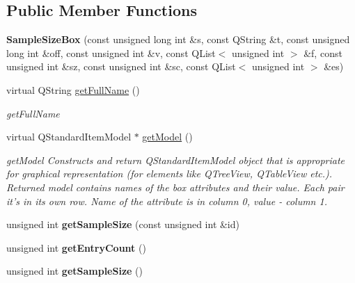 \subsection*{Public Member Functions}
\begin{DoxyCompactItemize}
\item 
\hypertarget{class_sample_size_box_a77e5453bb71d0c6072af6828970182e9}{{\bfseries Sample\-Size\-Box} (const unsigned long int \&s, const Q\-String \&t, const unsigned long int \&off, const unsigned int \&v, const Q\-List$<$ unsigned int $>$ \&f, const unsigned int \&sz, const unsigned int \&sc, const Q\-List$<$ unsigned int $>$ \&es)}\label{class_sample_size_box_a77e5453bb71d0c6072af6828970182e9}

\item 
virtual Q\-String \hyperlink{class_sample_size_box_a3cdb87618bba15d0c9e8cea9dde19ee5}{get\-Full\-Name} ()
\begin{DoxyCompactList}\small\item\em get\-Full\-Name \end{DoxyCompactList}\item 
virtual Q\-Standard\-Item\-Model $\ast$ \hyperlink{class_sample_size_box_a4ca94df68b61aebbe2c3b46b18a8d5e5}{get\-Model} ()
\begin{DoxyCompactList}\small\item\em get\-Model Constructs and return Q\-Standard\-Item\-Model object that is appropriate for graphical representation (for elements like Q\-Tree\-View, Q\-Table\-View etc.). Returned model contains names of the box attributes and their value. Each pair it's in its own row. Name of the attribute is in column 0, value -\/ column 1. \end{DoxyCompactList}\item 
\hypertarget{class_sample_size_box_ac31a0ecc005d1de51905250dd8deec25}{unsigned int {\bfseries get\-Sample\-Size} (const unsigned int \&id)}\label{class_sample_size_box_ac31a0ecc005d1de51905250dd8deec25}

\item 
\hypertarget{class_sample_size_box_ae4138da08b7f635ca32ed4aa6bcc005e}{unsigned int {\bfseries get\-Entry\-Count} ()}\label{class_sample_size_box_ae4138da08b7f635ca32ed4aa6bcc005e}

\item 
\hypertarget{class_sample_size_box_a553f299b53292fe2818d005decbe0f57}{unsigned int {\bfseries get\-Sample\-Size} ()}\label{class_sample_size_box_a553f299b53292fe2818d005decbe0f57}

\end{DoxyCompactItemize}
